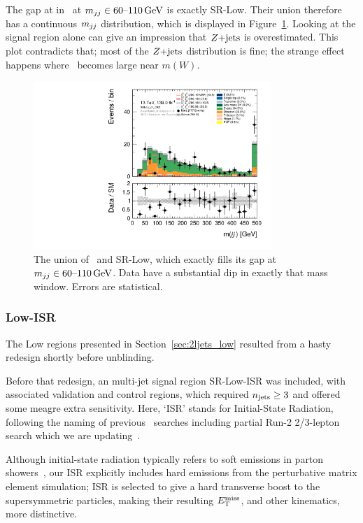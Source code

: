 The gap at in \crz\ at $\mjj \in 60\textrm{--}110\,\eV[G]$ is exactly SR-Low.
Their union therefore has a continuous $\mjj$ distribution, which is displayed
in Figure~\ref{fig:2ljets_low_sr_or_cr_region}.
Looking at the signal region alone can give an impression that $\zjets$ is
overestimated.
This plot contradicts that; most of the $\zjets$ distribution is fine;
the strange effect happens where \diboson\ becomes large near $m(W)$.

\begin{figure}[tp]
\centering
\includegraphics[width=0.8\textwidth]{figures/2ljets_low_mjj_SRLow_or_CRZ.pdf}
\caption[
The union of CR-Z and SR-Low
]{%
The union of \crz\ and SR-Low, which exactly fills its gap at
$\mjj \in 60\textrm{--}110\,\eV[G]$.
Data have a substantial dip in exactly that mass window.
Errors are statistical.
}
\label{fig:2ljets_low_sr_or_cr_region}
\end{figure}


\subsubsection{Low-ISR}
\label{sec:2ljets_low_isr}
The Low regions presented in Section~\ref{sec:2ljets_low} resulted from a
hasty redesign shortly before unblinding.

Before that redesign, an multi-jet signal region SR-Low-ISR was included,
with associated validation and control regions,
which required $\njet \geq 3$ and offered some meagre extra sensitivity.
Here, `ISR' stands for Initial-State Radiation, following the naming
of previous \atlas\ searches including partial Run-2 2/3-lepton
search which we are updating~\cite{atlas_23l_SUSY_2016_24}.

Although initial-state radiation typically refers to soft emissions in
parton showers~\cite{corcella2000initial, bewick2022initial},
our ISR explicitly includes hard emissions from the perturbative matrix element
simulation;
ISR is selected to give a hard transverse boost to the supersymmetric
particles, making their resulting $\met$, and other kinematics, more distinctive.

